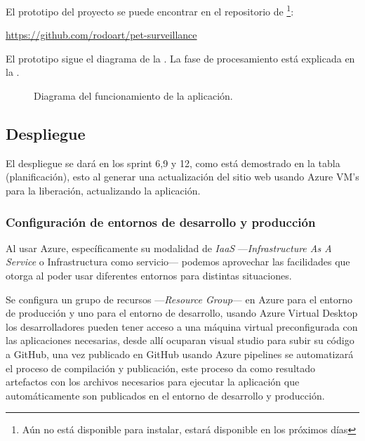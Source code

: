 El prototipo del proyecto se puede encontrar en el repositorio de \footnote{Aún no está disponible para instalar, estará disponible en los próximos días}:

\begin{quotebox}
    \href{https://github.com/rodoart/pet-surveillance}{https://github.com/rodoart/pet-surveillance}
\end{quotebox}    

El prototipo sigue el diagrama de la . La fase de procesamiento está explicada en la .

\begin{figure}
    \centering
    \caption[Diagrama del funcionamiento de la aplicación.]{Diagrama del funcionamiento de la aplicación.}
    \label{fig:funcionamiento}
    
\end{figure}


\subsection{Despliegue}

El despliegue se dará en los sprint 6,9 y 12, como está demostrado en la tabla (planificación), esto al generar una actualización del sitio web usando Azure VM's para la liberación, actualizando la aplicación. 

\subsubsection{Configuración de entornos de desarrollo y producción}

Al usar Azure, específicamente su modalidad de \textit{IaaS} —\textit{Infrastructure As A Service} o Infrastructura como servicio— podemos aprovechar las facilidades que otorga al poder usar diferentes entornos para distintas situaciones. 

Se configura un grupo de recursos —\textit{Resource Group}— en Azure para el entorno de producción y uno para el entorno de desarrollo, usando Azure Virtual Desktop los desarrolladores pueden tener acceso a una máquina virtual preconfigurada con las aplicaciones necesarias, desde allí ocuparan visual studio para subir su código a GitHub, una vez publicado en GitHub usando Azure pipelines se automatizará el proceso de compilación y publicación, este proceso da como resultado artefactos con los archivos necesarios para ejecutar la aplicación que automáticamente son publicados en el entorno de desarrollo y producción.

